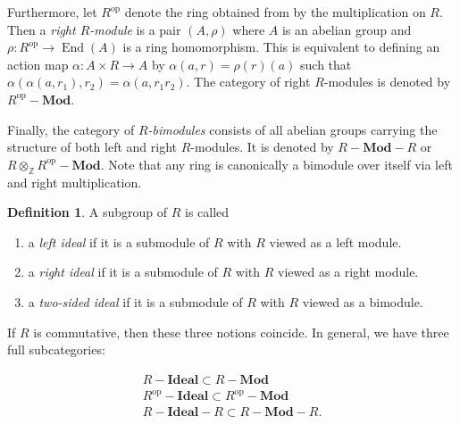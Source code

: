 \documentclass[10pt,letterpaper,cm]{nupset}
\theoremstyle{definition}
\newtheorem{definition}{Definition}[subsection]
\theoremstyle{theorem}
\theoremstyle{remark}
\newcommand{\Z}{\mathbb Z}
\newcommand{\1}{\mathbf{1}}
\newcommand{\0}{\vec 0}
\DeclareMathOperator{\op}{op}
\DeclareMathOperator{\ed}{End}
\begin{document}
Furthermore, let $R^{\op}$ denote the ring obtained from by the multiplication on $R$. Then a \textit{right $R$-module} is a pair $\left(A, \rho\right)$ where $A$ is an abelian group and $\rho : R^{\op} \to \ed(A)$ is a ring homomorphism. This is equivalent to defining an action map $\alpha : A \times R \to A$ by $\alpha(a, r) = \rho(r)(a)$ such that $\alpha\left(\alpha\left(a, r_{1}\right), r_{2}\right)=\alpha\left(a, r_{1} r_{2}\right)$.
 The category of right $R$-modules  is denoted by $R^{\op}{-}\mathbf{Mod}$.

Finally, the category of \textit{$R$-bimodules} consists of all abelian groups carrying the structure of both left and right $R$-modules. It is denoted by $R{-}\mathbf{Mod}{-}R$ or $R \otimes_{\Z}R^{\op}{-}\mathbf{Mod}$.
Note that any ring is canonically a bimodule over itself via left and right multiplication.

\begin{definition} A subgroup of $R$ is called
\begin{enumerate}
\item a \textit{left ideal} if it is a submodule  of $R$ with $R$ viewed as a left module.
\item a \textit{right ideal} if it is a submodule of $R$ with $R$ viewed as a right module.
\item a \textit{two-sided ideal} if it is a submodule of $R$ with $R$ viewed as a bimodule.
\end{enumerate}
\end{definition}

If $R$ is commutative, then these three notions coincide. In general, we have three full subcategories:

\begin{gather*}
R{-}\mathbf{Ideal} \subset R{-}\mathbf{Mod}
\\ R^{\op}{-}\mathbf{Ideal} \subset R^{\op}{-}\mathbf{Mod}
\\  R{-}\mathbf{Ideal}{-}R  \subset R{-}\mathbf{Mod}{-}R.
\end{gather*} 

\medskip
\end{document}
